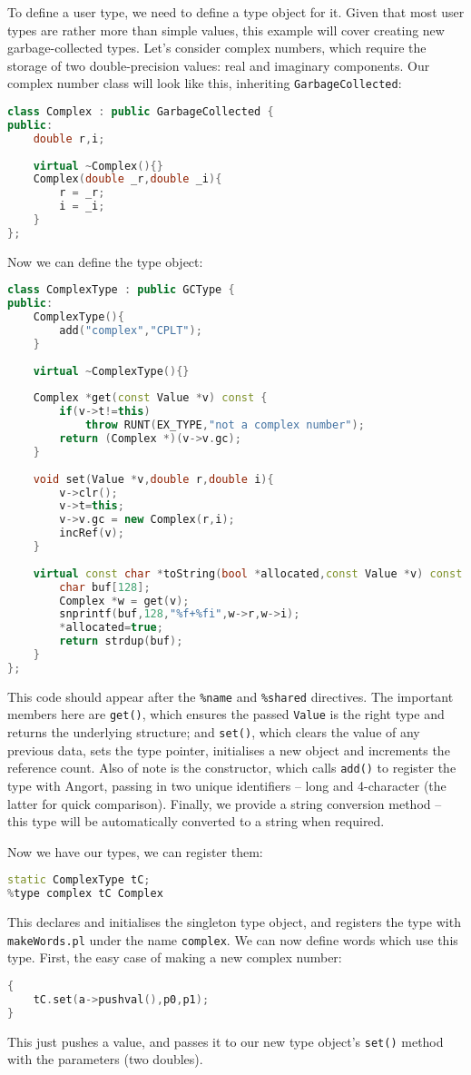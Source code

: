 To define a user type, we need to define a type object for it.
Given that most user types are rather more than simple values,
this example will cover creating new garbage-collected types.
Let's consider complex numbers, which require the storage of two
double-precision values: real and imaginary components.
Our complex number class will look like this, inheriting
\texttt{GarbageCollected}:
\begin{lstlisting}[language=c++]
class Complex : public GarbageCollected {
public:
    double r,i;
    
    virtual ~Complex(){}
    Complex(double _r,double _i){
        r = _r;
        i = _i;
    }
};
\end{lstlisting}
Now we can define the type object:
\begin{lstlisting}[language=c++]
class ComplexType : public GCType {
public:
    ComplexType(){
        add("complex","CPLT");
    }
    
    virtual ~ComplexType(){}
    
    Complex *get(const Value *v) const {
        if(v->t!=this)
            throw RUNT(EX_TYPE,"not a complex number");
        return (Complex *)(v->v.gc);
    }
    
    void set(Value *v,double r,double i){
        v->clr();
        v->t=this;
        v->v.gc = new Complex(r,i);
        incRef(v);
    }
    
    virtual const char *toString(bool *allocated,const Value *v) const {
        char buf[128];
        Complex *w = get(v);
        snprintf(buf,128,"%f+%fi",w->r,w->i);
        *allocated=true;
        return strdup(buf);
    }
};
\end{lstlisting}
This code should appear after the \texttt{\%name} and
\texttt{\%shared} directives.
The important members here are \texttt{get()}, which ensures the
passed \texttt{Value} is the right type and returns the underlying
structure; and \texttt{set()}, which clears the value of any
previous data, sets the type pointer, initialises a new object
and increments the reference count. Also of note is
the constructor, which calls \texttt{add()} to register the type
with Angort, passing in two unique identifiers -- long and 4-character
(the latter for quick comparison). Finally, we provide a string conversion
method -- this type will be automatically converted to a string
when required.

Now we have our types, we can register them:
\begin{lstlisting}[language=c++]
static ComplexType tC;
%type complex tC Complex
\end{lstlisting}
This declares and initialises the singleton type object,
and registers the type with \texttt{makeWords.pl} under the name
\texttt{complex}.
We can now define words which use this type. First, the easy case
of making a new complex number:
\begin{lstlisting}[language=c++]
%wordargs complex dd (r i -- complex)
{
    tC.set(a->pushval(),p0,p1);
}
\end{lstlisting}
This just pushes a value, and passes it to our new type object's
\texttt{set()} method with the parameters (two doubles).

